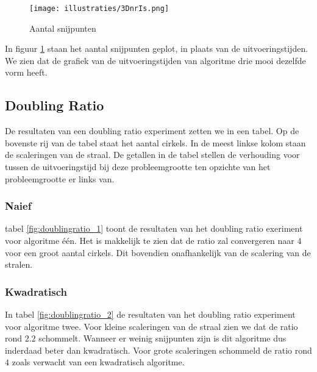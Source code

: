 \begin{figure}[H]
   	\centering
   	\texttt{[image: illustraties/3DnrIs.png]}
  	\label{fig:nr_intersections}
  	\caption{Aantal snijpunten}
\end{figure}

In figuur \ref{fig:nr_intersections} staan het aantal snijpunten geplot, in plaats van de uitvoeringstijden. We zien dat de grafiek van de uitvoeringstijden van algoritme drie mooi dezelfde vorm heeft.

\subsection{Doubling Ratio}
De resultaten van een doubling ratio experiment zetten we in een tabel. Op de bovenste rij van de tabel staat het aantal cirkels. In de meest linkse kolom staan de scaleringen van de straal. De getallen in de tabel stellen de verhouding voor tussen de uitvoeringstijd bij deze probleemgrootte ten opzichte van het probleemgrootte er links van.

\subsubsection{Naief}
\begin{table}[H]

\caption{Doubling ratio 1}
\label{fig:doublingratio_1}
\end{table}
tabel \ref{fig:doublingratio_1} toont de resultaten van het doubling ratio exeriment voor algoritme \'e\'en. Het is makkelijk te zien dat de ratio zal convergeren naar $4$ voor een groot aantal cirkels. Dit bovendien onafhankelijk van de scalering van de stralen.

\subsubsection{Kwadratisch}
\begin{table}[H]

\caption{Doubling ratio 2}
\label{fig:doublingratio_2}
\end{table}
In tabel \ref{fig:doublingratio_2} de resultaten van het doubling ratio experiment voor algoritme twee. Voor kleine scaleringen van de straal zien we dat de ratio rond $2.2$ schommelt. Wanneer er weinig snijpunten zijn is dit algoritme dus inderdaad beter dan kwadratisch.
Voor grote scaleringen schommeld de ratio rond $4$ zoals verwacht van een kwadratisch algoritme.

